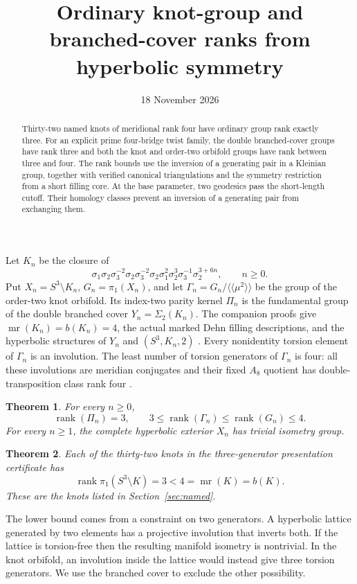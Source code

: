 \documentclass[11pt]{article}
\title{Ordinary knot-group and branched-cover ranks from hyperbolic symmetry}
\author{}
\date{18 November 2026}
\newtheorem{theorem}{Theorem}
\newcommand{\rk}{\operatorname{rank}}
\begin{document}
\maketitle
\begin{abstract}
Thirty-two named knots of meridional rank four have ordinary group
rank exactly three. For an explicit prime four-bridge twist family,
the double branched-cover groups have rank three and both the knot
and order-two orbifold groups have rank between three and four.
The rank bounds use the inversion of a generating pair in a Kleinian
group, together with verified canonical triangulations and the
symmetry restriction from a short filling core. At the base parameter,
two geodesics pass the short-length cutoff. Their homology classes
prevent an inversion of a generating pair from exchanging them.
\end{abstract}

Let $K_n$ be the closure of
\[
\sigma_1\sigma_2\sigma_3^{-2}\sigma_2\sigma_3^{-2}\sigma_2
\sigma_1^2\sigma_2^3\sigma_3^{-1}\sigma_2^{3+6n},\qquad n\ge0.
\]
Put $X_n=S^3\setminus K_n$, $G_n=\pi_1(X_n)$, and let
$\Gamma_n=G_n/\langle\!\langle\mu^2\rangle\!\rangle$ be the group of the
order-two knot orbifold. Its index-two parity kernel $\Pi_n$ is the
fundamental group of the double branched cover $Y_n=\Sigma_2(K_n)$.
The companion proofs give $\operatorname{mr}(K_n)=b(K_n)=4$,
the actual marked Dehn filling descriptions, and the hyperbolic
structures of $Y_n$ and $(S^3,K_n,2)$ \cite{family,covers,scope}.
Every nonidentity torsion element of $\Gamma_n$ is an involution.
The least number of torsion generators of $\Gamma_n$ is four:
all these involutions are meridian conjugates and their fixed $A_8$
quotient has double-transposition class rank four \cite{scope}.

\begin{theorem}\label{thm:family}
For every $n\ge0$,
\[
        \rk(\Pi_n)=3,\qquad 3\le\rk(\Gamma_n)\le\rk(G_n)\le4.
\]
For every $n\ge1$, the complete hyperbolic exterior $X_n$ has trivial
isometry group.
\end{theorem}

\begin{theorem}\label{thm:named}
Each of the thirty-two knots in the three-generator presentation
certificate \cite{uppers} has
\[
          \rk\pi_1(S^3\setminus K)=3<4=\operatorname{mr}(K)=b(K).
\]
These are the knots listed in Section~\ref{sec:named}.
\end{theorem}

The lower bound comes from a constraint on two generators. A
hyperbolic lattice generated by two elements has a projective
involution that inverts both. If the lattice is torsion-free then
the resulting manifold isometry is nontrivial. In the knot orbifold,
an involution inside the lattice would instead give three torsion
generators. We use the branched cover to exclude the other possibility.
\end{document}
